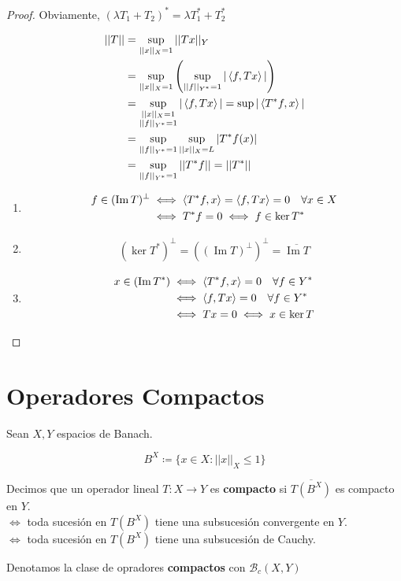  \begin{proof}
    Obviamente, $(\lambda T_1+T_2)^*=\lambda T_1^*+T_2^*$

    \begin{align*}
        ||T||&=\sup_{||x||_X=1}||Tx||_Y\\
        &=\sup_{||x||_X=1}\left(\sup_{||f||_{Y^*}=1}|\left\langle f,Tx\right\rangle|\right)\\
        &=\sup_{\substack{||x||_X=1\\||f||_{Y^*}=1}}|\left\langle f,Tx\right\rangle|=\sup|\left\langle T^*f,x\right\rangle|\\
        &=\sup_{||f||_{Y^*}=1}\sup_{||x||_X=L}|T^*f(x)|\\
        &=\sup_{||f||_{Y^*}=1}||T^*f||=||T^*||
    \end{align*}

    \begin{enumerate}[label=(\alph*)]
        \item \begin{align*}
            f\in (\operatorname{Im}T)^\perp&\iff \left\langle T^*f,x\right\rangle=\left\langle f,Tx\right\rangle=0\quad\forall x\in X\\
            &\iff T^*f=0\iff f\in \ker T^*
        \end{align*}

        \item \begin{align*}
            (\ker T^*)^\perp=((\operatorname{Im}T)^\perp)^\perp=\overline{\operatorname{Im}T}
        \end{align*}

        \item \begin{align*}
            x\in (\operatorname{Im}T^*)&\iff \left\langle T^*f,x\right\rangle=0\quad\forall f\in Y^*\\
            &\iff \left\langle f,Tx\right\rangle=0\quad\forall f\in Y^*\\
            &\iff Tx=0\iff x\in \ker T 
        \end{align*}
    \end{enumerate}
 \end{proof}

 \section{Operadores Compactos}

 \begin{fdefinition}
    Sean $X,Y$ espacios de Banach.

    \[B^X\coloneqq \{x\in X:||x||_X\leq 1\}\]

    Decimos que un operador lineal $T:X\to Y$ es \textbf{compacto} si $\overline{T(B^X)}$ es compacto en $Y$.\\
    $\iff$ toda sucesión en ${T(B^X)}$ tiene una subsucesión convergente en $Y$.\\
    $\iff$ toda sucesión en $T(B^X)$ tiene una subsucesión de Cauchy.

    Denotamos la clase de opradores \textbf{compactos} con $\mathcal{B}_c(X,Y)$
 \end{fdefinition}

